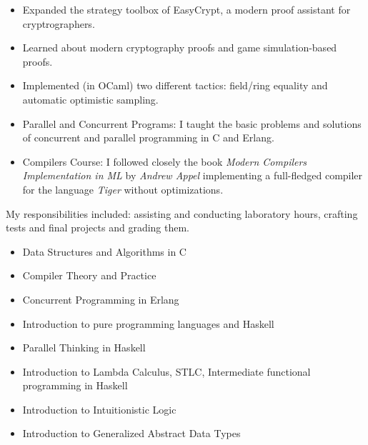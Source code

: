    \begin{itemize}
        \item Expanded the strategy toolbox of
            EasyCrypt, a modern proof assistant for cryptrographers.
        \item Learned about modern cryptography proofs and game simulation-based proofs.
        \item Implemented (in OCaml) two different tactics: field/ring equality
            and automatic optimistic sampling.
    \end{itemize}

\newpage


    \begin{itemize}
        \item Parallel and Concurrent Programs: I taught the basic
            problems and solutions of concurrent and parallel programming in C and Erlang.
        \item Compilers Course: I followed closely the book \emph{Modern
                Compilers Implementation in ML} by \emph{Andrew Appel}
            implementing a full-fledged compiler for the language
            \emph{Tiger} without optimizations.
    \end{itemize}
    \divider

    My responsibilities included: assisting and conducting laboratory
    hours, crafting tests and final projects and grading them.
    \begin{itemize}
        \item {Data Structures and Algorithms in C}
        \item {Compiler Theory and Practice}
        \item {Concurrent Programming in Erlang}
        \item {Introduction to pure programming languages and Haskell}
        \item {Parallel Thinking in Haskell}
        \item {Introduction to Lambda Calculus, STLC, Intermediate functional programming in Haskell}
        \item {Introduction to Intuitionistic Logic}
        \item {Introduction to Generalized Abstract Data Types}
    \end{itemize}

